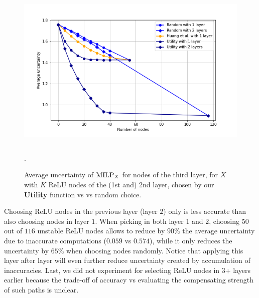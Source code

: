 \begin{figure}[h!]
	\centering
	\vspace*{-0.3cm}
	\includegraphics[height=8.5cm]{Plot for table 3}.
	\vspace*{-0.4cm}
	\caption{Average uncertainty of ${\textrm{MILP}}_X$ for nodes of the third layer, for $X$ with $K$ ReLU nodes of the (1st and) 2nd layer, chosen by our {\bf Utility} function vs \cite{ DivideAndSlide} vs random choice.}
	\label{fig_table3}
\end{figure}


\iffalse
Choosing ReLU nodes in the previous layer (layer $2$) only is less accurate than 
also choosing nodes in layer $1$. When picking in both layer $1$ and $2$, choosing $50$ out of $116$ unstable ReLU nodes allows to reduce by $90\%$ the average uncertainty due to inaccurate computations ($0.059$ vs $0.574$), while it only reduces the uncertainty by $65\%$ when choosing nodes randomly. Notice that applying this layer after layer will even further reduce uncertainty created by accumulation of inaccuracies. 
Last, we did not experiment for selecting ReLU nodes in 3+ layers earlier because the trade-off of accuracy vs evaluating the compensating strength of such paths is unclear.

